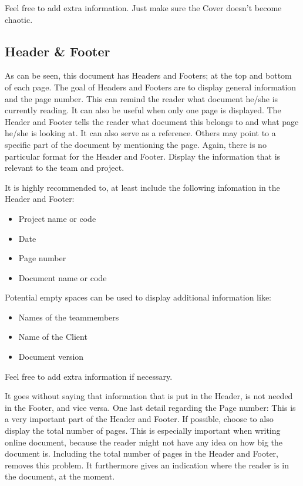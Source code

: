 \documentclass[10pt]{report}
\begin{document}
Feel free to add extra information. Just make sure the Cover doesn't become chaotic.

\subsection{Header \& Footer}

As can be seen, this document has Headers and Footers; at the top and bottom of each page. The goal of Headers and Footers are to display general information and the page number. This can remind the reader what document he/she is currently reading. It can also be useful when only one page is displayed. The Header and Footer tells the reader what document this belongs to and what page he/she is looking at. It can also serve as a reference. Others may point to a specific part of the document by mentioning the page. Again, there is no particular format for the Header and Footer. Display the information that is relevant to the team and project.

It is highly recommended to, at least include the following infomation in the Header and Footer:

\begin{itemize}
	\item Project name or code
	\item Date
	\item Page number
	\item Document name or code
\end{itemize}

Potential empty spaces can be used to display additional information like:

\begin{itemize}
	\item Names of the teammembers
	\item Name of the Client
	\item Document version
\end{itemize}

Feel free to add extra information if necessary.

\bigskip

It goes without saying that information that is put in the Header, is not needed in the Footer, and vice versa. One last detail regarding the Page number: This is a very important part of the Header and Footer. If possible, choose to also display the total number of pages. This is especially important when writing online document, because the reader might not have any idea on how big the document is. Including the total number of pages in the Header and Footer, removes this problem. It furthermore gives an indication where the reader is in the document, at the moment. 
\end{document}

